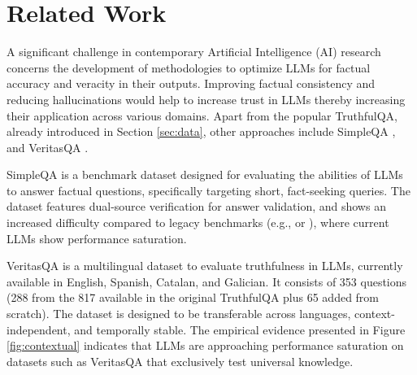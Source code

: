 \section{Related Work}
\label{sec:related_work}

A significant challenge in contemporary Artificial Intelligence (AI) research concerns the development of methodologies to optimize LLMs for factual accuracy and veracity in their outputs. %
Improving factual consistency and reducing hallucinations would help to increase trust in LLMs thereby increasing their application across various domains. Apart from the popular TruthfulQA, already introduced in Section \ref{sec:data}, other approaches include SimpleQA \cite{wei2024measuring},
and VeritasQA \cite{aula-blasco-etal-2025-veritasqa}.

SimpleQA is a benchmark dataset designed for evaluating the abilities of LLMs to answer factual questions, specifically targeting short, fact-seeking queries. The dataset %
features dual-source verification for answer validation, %
and shows an increased difficulty compared to legacy benchmarks (e.g., \citet{joshi-etal-2017-triviaqa} or \citet{kwiatkowski-etal-2019-natural}), where current LLMs show performance saturation. 

VeritasQA is a multilingual dataset to evaluate truthfulness in LLMs, currently available in English, Spanish, Catalan, and Galician. It consists of 353 questions (288 from the 817 available in the original TruthfulQA plus 65 added from scratch). The dataset is designed to be transferable across languages, context-independent, and temporally stable. The empirical evidence presented in Figure \ref{fig:contextual} indicates that LLMs are approaching performance saturation on datasets such as VeritasQA that exclusively test universal knowledge. %